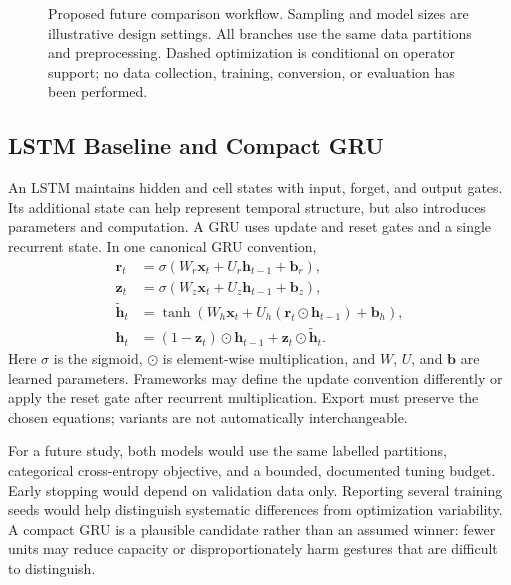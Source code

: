 \documentclass[conference]{IEEEtran}
\begin{document}
\begin{figure}[t]
\centering

\caption{Proposed future comparison workflow. Sampling and model sizes are illustrative design settings. All branches use the same data partitions and preprocessing. Dashed optimization is conditional on operator support; no data collection, training, conversion, or evaluation has been performed.}
\label{fig:workflow}
\end{figure}

\subsection{LSTM Baseline and Compact GRU}
An LSTM maintains hidden and cell states with input, forget, and output gates. Its additional state can help represent temporal structure, but also introduces parameters and computation. A GRU uses update and reset gates and a single recurrent state. In one canonical GRU convention,
\begin{align}
\mathbf{r}_t &= \sigma(W_r\mathbf{x}_t+U_r\mathbf{h}_{t-1}+\mathbf{b}_r),\\
\mathbf{z}_t &= \sigma(W_z\mathbf{x}_t+U_z\mathbf{h}_{t-1}+\mathbf{b}_z),\\
\widetilde{\mathbf{h}}_t &= \tanh(W_h\mathbf{x}_t+
 U_h(\mathbf{r}_t\odot\mathbf{h}_{t-1})+\mathbf{b}_h),\\
\mathbf{h}_t &= (1-\mathbf{z}_t)\odot\mathbf{h}_{t-1}
 +\mathbf{z}_t\odot\widetilde{\mathbf{h}}_t.
\end{align}
Here $\sigma$ is the sigmoid, $\odot$ is element-wise multiplication, and $W$, $U$, and $\mathbf{b}$ are learned parameters. Frameworks may define the update convention differently or apply the reset gate after recurrent multiplication. Export must preserve the chosen equations; variants are not automatically interchangeable.

For a future study, both models would use the same labelled partitions, categorical cross-entropy objective, and a bounded, documented tuning budget. Early stopping would depend on validation data only. Reporting several training seeds would help distinguish systematic differences from optimization variability. A compact GRU is a plausible candidate rather than an assumed winner: fewer units may reduce capacity or disproportionately harm gestures that are difficult to distinguish.
\end{document}
